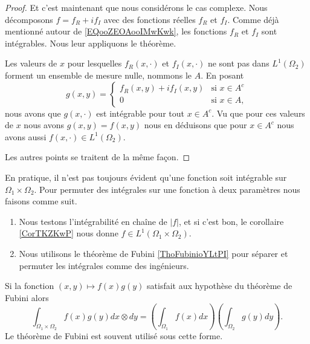 \begin{proof}
    Et c'est maintenant que nous considérons le cas complexe. Nous décomposons \( f=f_R+if_I\) avec des fonctions réelles \( f_R\) et \( f_I\). Comme déjà mentionné autour de \eqref{EQooZEOAooIMwKwk}, les fonctions \( f_R\) et \( f_I\) sont intégrables. Nous leur appliquons le théorème.

    Les valeurs de \( x\) pour lesquelles \( f_R(x,\cdot)\) et \( f_I(x,\cdot)\) ne sont pas dans \( L^1(\Omega_2)\) forment un ensemble de mesure nulle, nommons le \( A\). En posant
    \begin{equation}
        g(x,y)=\begin{cases}
            f_R(x,y)+if_I(x,y)    &   \text{si } x\in A^c\\
            0    &    \text{si } x\in A,
        \end{cases}
    \end{equation}
    nous avons que \( g(x,\cdot)\) est intégrable pour tout \( x\in A^c\). Vu que pour ces valeurs de \( x\) nous avons \( g(x,y)=f(x,y)\) nous en déduisons que pour \( x\in A^c\) nous avons aussi \( f(x,\cdot)\in L^1(\Omega_2)\).

    Les autres points se traitent de la même façon.
\end{proof}

\begin{normaltext}      \label{NORMooKIRJooPvyPWQ}
    En pratique, il n'est pas toujours évident qu'une fonction soit intégrable sur \( \Omega_1\times \Omega_2\). Pour permuter des intégrales sur une fonction à deux paramètres nous faisons comme suit.
    \begin{enumerate}
        \item
            Nous testons l'intégrabilité en chaîne de \( | f |\), et si c'est bon, le corollaire \ref{CorTKZKwP} nous donne \( f\in L^1(\Omega_1\times \Omega_2)\).
        \item
            Nous utilisons le théorème de Fubini \ref{ThoFubinioYLtPI} pour séparer et permuter les intégrales comme des ingénieurs.
    \end{enumerate}

    Si la fonction \( (x,y)\mapsto f(x)g(y)\) satisfait aux hypothèse du théorème de Fubini alors
    \begin{equation}    \label{EqTJEEsJW}
        \int_{\Omega_1\times \Omega_2} f(x)g(y)dx\otimes dy=\left( \int_{\Omega_1}f(x)dx \right)\left( \int_{\Omega_2}g(y)dy \right).
    \end{equation}
    Le théorème de Fubini est souvent utilisé sous cette forme.
    
\end{normaltext}

